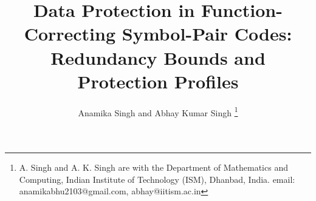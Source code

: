 \documentclass[11pt,draftclsnofoot,journal,onecolumn]{IEEEtran}
\begin{document}
\title{Data Protection in Function-Correcting Symbol-Pair Codes: Redundancy Bounds and Protection Profiles}
%
%
%

\author{ 
        Anamika Singh and
        Abhay Kumar Singh%
\thanks{ A. Singh and A. K. Singh are with the Department of Mathematics and Computing, Indian Institute of Technology (ISM), Dhanbad, India. email: anamikabhu2103@gmail.com, abhay@iitism.ac.in}}%

\date{ }
% 
%




% 
\end{document}
